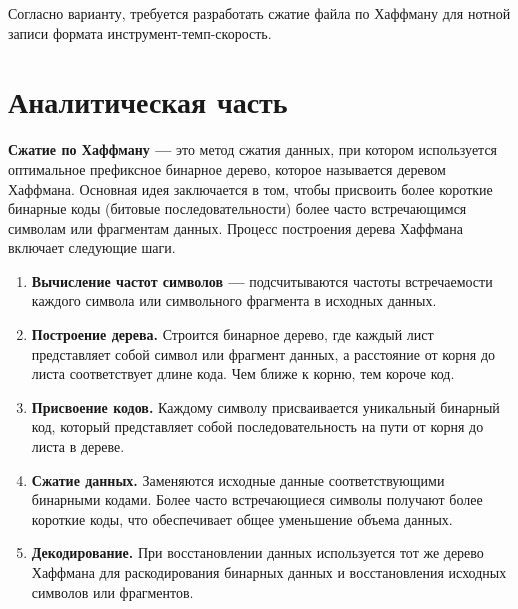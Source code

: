 \documentclass[12pt, a4paper]{article}
\begin{document}
Согласно варианту, требуется разработать сжатие 
файла по Хаффману для нотной записи формата инструмент-темп-скорость.
\newpage
\section{Аналитическая часть}
\textbf{Сжатие по Хаффману ---} это метод сжатия 
данных, при котором используется оптимальное 
префиксное бинарное дерево, которое называется 
деревом Хаффмана. Основная идея заключается в том, чтобы присвоить 
более короткие бинарные коды (битовые последовательности) более часто 
встречающимся символам или фрагментам данных.
Процесс построения дерева Хаффмана включает следующие шаги.
\begin{enumerate}
	\item \textbf{Вычисление частот символов ---} подсчитываются частоты 
	встречаемости каждого символа или символьного фрагмента в исходных 
	данных.
	\item \textbf{Построение дерева.} Строится бинарное дерево, где 
	каждый лист представляет собой символ или фрагмент данных, а 
	расстояние от корня до листа соответствует длине кода. Чем ближе к 
	корню, тем короче код.
	\item \textbf{Присвоение кодов.} Каждому символу присваивается 
	уникальный бинарный код, который представляет собой 
	последовательность на пути от корня до листа в дереве.
	\item \textbf{Сжатие данных.} Заменяются исходные данные 
	соответствующими бинарными кодами. Более часто встречающиеся 
	символы получают более короткие коды, что обеспечивает общее 
	уменьшение объема данных.
	\item \textbf{Декодирование.} При восстановлении данных 
	используется тот же дерево Хаффмана для раскодирования бинарных 
	данных и восстановления исходных символов или фрагментов.
\end{enumerate}
\newpage
\end{document}
